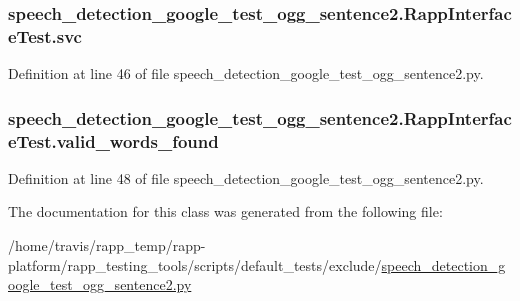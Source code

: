\hypertarget{classspeech__detection__google__test__ogg__sentence2_1_1RappInterfaceTest_ab573dab544456124b2bd694f577a5bb3}{
\subsubsection[{svc}]{\setlength{\rightskip}{0pt plus 5cm}speech\-\_\-detection\-\_\-google\-\_\-test\-\_\-ogg\-\_\-sentence2.\-Rapp\-Interface\-Test.\-svc}}\label{classspeech__detection__google__test__ogg__sentence2_1_1RappInterfaceTest_ab573dab544456124b2bd694f577a5bb3}


Definition at line 46 of file speech\-\_\-detection\-\_\-google\-\_\-test\-\_\-ogg\-\_\-sentence2.\-py.

\hypertarget{classspeech__detection__google__test__ogg__sentence2_1_1RappInterfaceTest_afa9a6449293346d27b73fc6e379cc70e}{
\subsubsection[{valid\-\_\-words\-\_\-found}]{\setlength{\rightskip}{0pt plus 5cm}speech\-\_\-detection\-\_\-google\-\_\-test\-\_\-ogg\-\_\-sentence2.\-Rapp\-Interface\-Test.\-valid\-\_\-words\-\_\-found}}\label{classspeech__detection__google__test__ogg__sentence2_1_1RappInterfaceTest_afa9a6449293346d27b73fc6e379cc70e}


Definition at line 48 of file speech\-\_\-detection\-\_\-google\-\_\-test\-\_\-ogg\-\_\-sentence2.\-py.



The documentation for this class was generated from the following file\-:\begin{DoxyCompactItemize}
\item 
/home/travis/rapp\-\_\-temp/rapp-\/platform/rapp\-\_\-testing\-\_\-tools/scripts/default\-\_\-tests/exclude/\hyperlink{speech__detection__google__test__ogg__sentence2_8py}{speech\-\_\-detection\-\_\-google\-\_\-test\-\_\-ogg\-\_\-sentence2.\-py}\end{DoxyCompactItemize}
